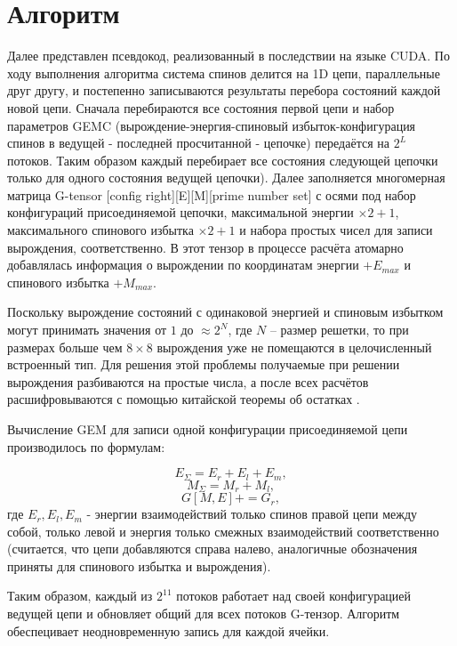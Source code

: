 \documentclass[utf8, babel, sor, jor, amsmath, amssymb, reprint]{elsarticle} %
\begin{document}
	\section{Алгоритм}
	Далее представлен псевдокод, реализованный в последствии на языке CUDA. По ходу выполнения алгоритма система спинов делится на 1D цепи, параллельные друг другу, и постепенно записываются результаты перебора состояний каждой новой цепи. Сначала перебираются все состояния первой цепи и набор параметров GEMC (вырождение-энергия-спиновый избыток-конфигурация спинов в ведущей - последней просчитанной - цепочке) передаётся на $2^L$ потоков. Таким образом каждый перебирает все состояния следующей цепочки только для одного состояния ведущей цепочки). Далее заполняется многомерная матрица G-tensor [config right][E][M][prime number set] с осями под набор конфигураций присоединяемой цепочки, максимальной энергии $\times 2 + 1$, максимального спинового избытка $\times 2 + 1$ и набора простых чисел для записи вырождения, соответственно. В этот тензор в процессе расчёта атомарно добавлялась информация о вырождении по координатам энергии $+ E_{max}$ и спинового избытка $+ M_{max}$.

	Поскольку вырождение состояний с одинаковой энергией и спиновым избытком могут принимать значения от $1$ до $\approx 2^{N}$, где $N$ -- размер решетки, то при размерах больше чем $8 \times 8$ вырождения уже не помещаются в целочисленный встроенный тип. Для решения этой проблемы получаемые при решении вырождения разбиваются на простые числа, а после всех расчётов расшифровываются с помощью китайской теоремы об остатках \cite{katz2007mathematics}.

	Вычисление GEM для записи одной конфигурации присоединяемой цепи производилось по формулам:

	\begin{equation*}
		E_\Sigma = E_r + E_l + E_m,
	\end{equation*}
	\begin{equation*}
		M_\Sigma = M_r + M_l,
	\end{equation*}
	\begin{equation*}
		G[M, E] += G_r,
	\end{equation*}
	где $E_r, E_l, E_m$ - энергии взаимодействий только спинов правой цепи между собой, только левой и энергия только смежных взаимодействий соответственно (считается, что цепи добавляются справа налево, аналогичные обозначения приняты для спинового избытка и вырождения).

	Таким образом, каждый из $2^11$ потоков работает над своей конфигурацией ведущей цепи и обновляет общий для всех потоков G-тензор. Алгоритм обеспецивает неодновременную запись для каждой ячейки. 
\end{document}
